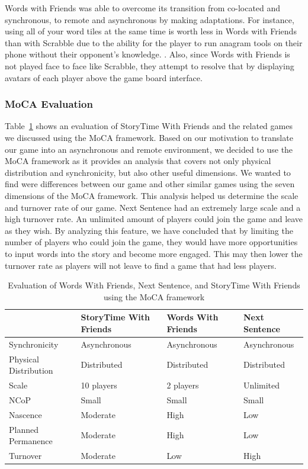 \documentclass{sigchi}
\begin{document}
Words with Friends was able to overcome its transition from co-located and synchronous, to remote and asynchronous by making adaptations. For instance, using all of your word tiles at the same time is worth less in Words with Friends than with Scrabble due to the ability for the player to run anagram tools on their phone without their opponent's knowledge. \cite{wwf-vs-scrabble}. Also, since Words with Friends is not played face to face like Scrabble, they attempt to resolve that by displaying avatars of each player above the game board interface.

\subsubsection{MoCA Evaluation}
Table~\ref{tab:moca_table} shows an evaluation of StoryTime With Friends and the related games we discussed using the MoCA framework. Based on our motivation to translate our game into an asynchronous and remote environment, we decided to use the MoCA framework as it provides an analysis that covers not only physical distribution and synchronicity, but also other useful dimensions. We wanted to find were differences between our game and other similar games using the seven dimensions of the MoCA framework. This analysis helped us determine the scale and turnover rate of our game. Next Sentence had an extremely large scale and a high turnover rate. An unlimited amount of players could join the game and leave as they wish. By analyzing this feature, we have concluded that by limiting the number of players who could join the game, they would have more opportunities to input words into the story and become more engaged. This may then lower the turnover rate as players will not leave to find a game that had less players.

\begin{table}[H]
\centering
\begin{tabularx}{\linewidth}{ >{\small}l | >{\raggedright\small}X | >{\small\raggedright}X | >{\small}l }
 &
StoryTime With Friends &
Words With Friends & 
Next Sentence \\ \hline \hline
Synchronicity & Asynchronous & Asynchronous & Asynchronous \\ \hline
Physical Distribution & Distributed & Distributed &  Distributed \\ \hline
Scale & 10 {\footnotesize players} & 2 {\footnotesize players} & Unlimited \\ \hline
NCoP & Small & Small & Small \\ \hline
Nascence & Moderate & High & Low \\ \hline
Planned Permanence & Moderate & High & Low \\ \hline
Turnover & Moderate & Low & High \\ \hline
\end{tabularx}
\caption{Evaluation of Words With Friends, Next Sentence, and StoryTime With Friends using the MoCA framework}
\label{tab:moca_table}
\end{table} 
 
\end{document}
